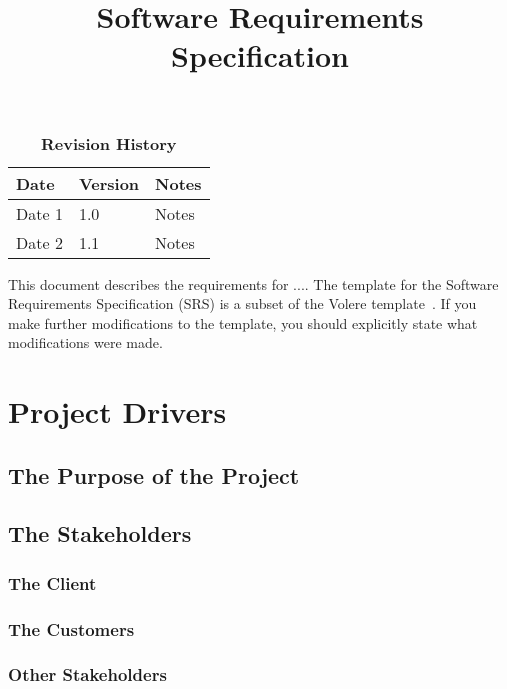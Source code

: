 \documentclass[12pt, titlepage]{article}
\title{Software Requirements Specification\\\progname}
\author{\authname}
\date{}
\begin{document}
\maketitle

\tableofcontents
\listoftables
\listoffigures

\begin{table}[bp]
\caption{\bf Revision History}
\begin{tabularx}{\textwidth}{p{3cm}p{2cm}X}
\toprule {\bf Date} & {\bf Version} & {\bf Notes}\\
\midrule
Date 1 & 1.0 & Notes\\
Date 2 & 1.1 & Notes\\
\bottomrule
\end{tabularx}
\end{table}

\newpage


This document describes the requirements for ....  The template for the Software
Requirements Specification (SRS) is a subset of the Volere
template~\citep{RobertsonAndRobertson2012}.  If you make further modifications
to the template, you should explicitly state what modifications were made.

\section{Project Drivers}

\subsection{The Purpose of the Project}

\subsection{The Stakeholders}

\subsubsection{The Client}

\subsubsection{The Customers}

\subsubsection{Other Stakeholders}
\end{document}

